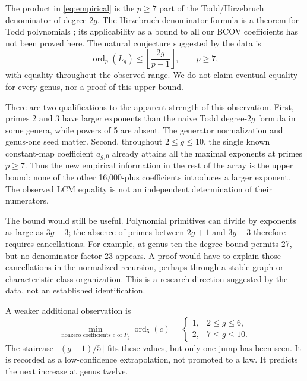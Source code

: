 \documentclass[11pt]{article}
\newcommand{\val}{\operatorname{ord}}
\begin{document}
The product in \eqref{eq:empirical} is the $p\ge7$ part of the
Todd/Hirzebruch denominator of degree $2g$.
The Hirzebruch denominator formula is a theorem for Todd polynomials
\cite{BV}; its applicability as a bound to all our BCOV coefficients
has not been proved here. The natural conjecture suggested by the data is
\[
 \val_p(L_g)\le\left\lfloor\frac{2g}{p-1}\right\rfloor,
 \qquad p\ge7,
\]
with equality throughout the observed range. We do not claim eventual equality
for every genus, nor a proof of this upper bound.

\begin{table}[ht]\centering

\caption{Exact denominators in the full YY polynomials. The factors at 2 and 3
are displayed separately; the last column is the observed $p\ge7$ part.}
\end{table}

There are two qualifications to the apparent strength of this observation.
First, primes 2 and 3 have larger exponents than the naive Todd degree-$2g$
formula in some genera, while powers of 5 are absent. The generator
normalization and genus-one seed matter.
Second, throughout $2\le g\le10$, the single known constant-map coefficient
$a_{g,0}$ already attains all the maximal exponents at primes $p\ge7$.
Thus the new empirical information in the rest of the array is the upper bound:
none of the other 16,000-plus coefficients introduces a larger exponent.
The observed LCM equality is not an independent determination of their numerators.

The bound would still be useful. Polynomial primitives can divide by exponents
as large as $3g-3$; the absence of primes between $2g+1$ and $3g-3$ therefore
requires cancellations. For example, at genus ten the degree bound permits
27, but no denominator factor 23 appears.
A proof would have to explain those cancellations in the normalized recursion,
perhaps through a stable-graph or characteristic-class organization. This is a
research direction suggested by the data, not an established identification.

A weaker additional observation is
\[
 \min_{\text{nonzero coefficients }c\text{ of }P_g}\val_5(c)=
 \begin{cases}1,&2\le g\le6,\\2,&7\le g\le10.\end{cases}
\]
The staircase $\lceil(g-1)/5\rceil$ fits these values, but only one jump has
been seen. It is recorded as a low-confidence extrapolation, not promoted
to a law. It predicts the next increase at genus twelve.
\end{document}
